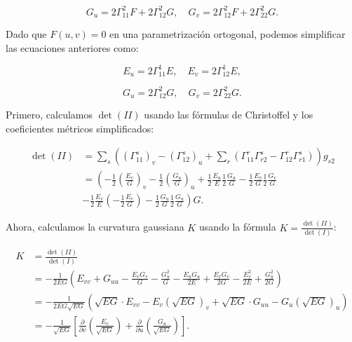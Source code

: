 \begin{problema}
\begin{dem}
$$
G_u = 2\Gamma_{11}^2 F + 2\Gamma_{12}^2 G, \quad G_v = 2\Gamma_{12}^2 F + 2\Gamma_{22}^2 G.
$$

Dado que $F(u,v) = 0$ en una parametrización ortogonal, podemos simplificar las ecuaciones anteriores como:

$$
E_u = 2\Gamma_{11}^1 E, \quad E_v = 2\Gamma_{12}^1 E,
$$

$$
G_u = 2\Gamma_{12}^2 G, \quad G_v = 2\Gamma_{22}^2 G.
$$

Primero, calculamos $\det(II)$ usando las fórmulas de Christoffel y los coeficientes métricos simplificados:

$$
\begin{aligned}
\det(II) &= \sum_s\left(\left(\Gamma_{11}^s\right)_v-\left(\Gamma_{12}^s\right)_u+\sum_r\left(\Gamma_{11}^r \Gamma_{r 2}^s-\Gamma_{12}^r \Gamma_{r 1}^s\right)\right) g_{s 2} \\
&= \left(-\frac{1}{2}\left(\frac{E_v}{G}\right)_v-\frac{1}{2}\left(\frac{G_u}{G}\right)_u+\frac{1}{2} \frac{E_u}{E} \frac{1}{2} \frac{G_u}{G}-\frac{1}{2} \frac{E_v}{G} \frac{1}{2} \frac{G_v}{G}\right. \\
&\left.-\frac{1}{2} \frac{E_v}{E}\left(-\frac{1}{2} \frac{E_v}{G}\right)-\frac{1}{2} \frac{G_u}{G} \frac{1}{2} \frac{G_u}{G}\right) G.
\end{aligned}
$$

Ahora, calculamos la curvatura gaussiana $K$ usando la fórmula $K = \frac{\det(II)}{\det(I)}$:

$$
\begin{aligned}
K &= \frac{\det(II)}{\det(I)} \\
&= -\frac{1}{2 E G}\left(E_{vv}+G_{uu}-\frac{E_v G_v}{G}-\frac{G_u^2}{G}-\frac{E_u G_u}{2 E}+\frac{E_v G_v}{2 G}-\frac{E_v^2}{2 E}+\frac{G_u^2}{2 G}\right) \\
&= -\frac{1}{2 E G \sqrt{E G}}\left(\sqrt{E G} \cdot E_{vv}-E_v(\sqrt{E G})_v+\sqrt{E G} \cdot G_{uu}-G_u(\sqrt{E G})_u\right) \\
&= -\frac{1}{\sqrt{E G}}\left[\frac{\partial}{\partial v}\left(\frac{E_{v}}{\sqrt{E G}}\right)+\frac{\partial}{\partial u}\left(\frac{G_{u}}{\sqrt{E G}}\right)\right].
\end{aligned}
$$



\end{dem}
\end{problema}


%
%

